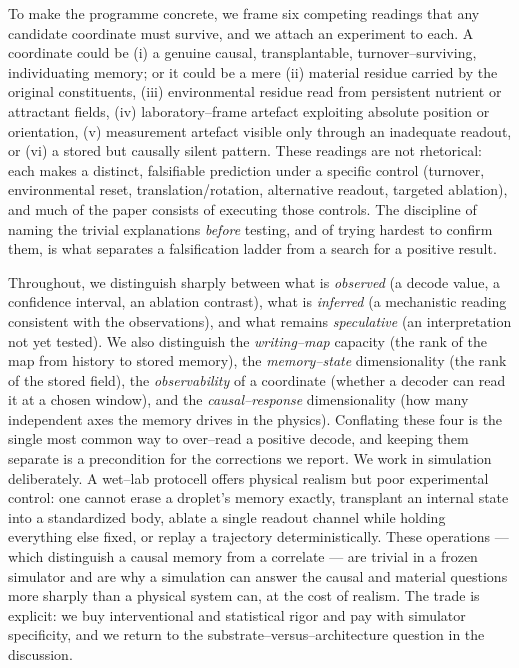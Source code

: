 \documentclass[11pt]{article}
\begin{document}
To make the programme concrete, we frame six competing readings that any candidate coordinate must survive, and we
attach an experiment to each. A coordinate could be (i) a genuine causal, transplantable, turnover--surviving,
individuating memory; or it could be a mere (ii) material residue carried by the original constituents, (iii)
environmental residue read from persistent nutrient or attractant fields, (iv) laboratory--frame artefact exploiting
absolute position or orientation, (v) measurement artefact visible only through an inadequate readout, or (vi) a
stored but causally silent pattern. These readings are not rhetorical: each makes a distinct, falsifiable prediction
under a specific control (turnover, environmental reset, translation/rotation, alternative readout, targeted
ablation), and much of the paper consists of executing those controls. The discipline of naming the trivial
explanations \emph{before} testing, and of trying hardest to confirm them, is what separates a falsification ladder
from a search for a positive result.

Throughout, we distinguish sharply between what is \emph{observed} (a decode value, a confidence interval, an
ablation contrast), what is \emph{inferred} (a mechanistic reading consistent with the observations), and what
remains \emph{speculative} (an interpretation not yet tested). We also distinguish the \emph{writing--map} capacity
(the rank of the map from history to stored memory), the \emph{memory--state} dimensionality (the rank of the
stored field), the \emph{observability} of a coordinate (whether a decoder can read it at a chosen window), and the
\emph{causal--response} dimensionality (how many independent axes the memory drives in the physics). Conflating
these four is the single most common way to over--read a positive decode, and keeping them separate is a
precondition for the corrections we report. We work in simulation deliberately. A wet--lab protocell offers physical realism but poor experimental control: one cannot erase a droplet's memory exactly, transplant an internal state into a standardized body, ablate a single readout channel while holding everything else fixed, or replay a trajectory deterministically. These operations --- which distinguish a causal memory from a correlate --- are trivial in a frozen simulator and are why a simulation can answer the causal and material questions more sharply than a physical system can, at the cost of realism. The trade is explicit: we buy interventional and statistical rigor and pay with simulator specificity, and we return to the substrate--versus--architecture question in the discussion.
\end{document}
